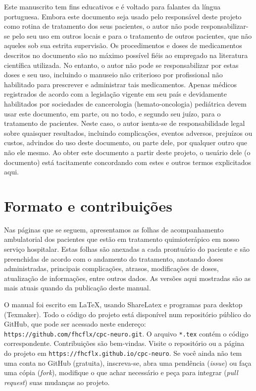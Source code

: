 \documentclass[11pt,a4paper,oldfontcommands]{memoir}
\begin{document}
Este manuscrito tem fins educativos e é voltado para falantes da língua portuguesa.  Embora este documento seja usado pelo responsável deste projeto como rotina de tratamento dos seus pacientes, o autor não pode responsabilizar-se pelo seu uso em outros locais e para o tratamento de outros pacientes, que não aqueles sob sua estrita supervisão. Os procedimentos e doses de medicamentos descritos no documento são no máximo possível fiéis ao empregado na literatura científica utilizada. No entanto, o autor não pode se responsabilizar por estas doses e seu uso, incluindo o manuseio não criterioso por profissional não habilitado para prescrever e administrar tais medicamentos. Apenas médicos registrados de acordo com a legislação vigente em seu país e devidamente habilitados por sociedades de cancerologia (hemato-oncologia) pediátrica devem usar este documento, em parte, ou no todo, e segundo seu juízo, para o tratamento de pacientes. Neste caso, o autor isenta-se de responsabilidade legal sobre quaisquer resultados, incluindo complicações, eventos adversos, prejuízos ou custos, advindos do uso deste documento, ou parte dele, por qualquer outro que não ele mesmo. Ao obter este documento a partir deste projeto, o usuário dele (o documento) está tacitamente concordando com estes e outros termos explicitados aqui.

\section{Formato e contribuições}

Nas páginas que se seguem, apresentamos as folhas de acompanhamento ambulatorial dos pacientes que estão em tratamento quimioterápico em nosso serviço hospitalar. Estas folhas são anexadas a cada prontuário do paciente e são preenchidas de acordo com o andamento do tratamento, anotando doses administradas, principais complicações, atrasos, modificações de doses, atualização de informações, entre outros dados. As versões aqui mostradas são as mais atuais quando da publicação deste manual.

O manual foi escrito em LaTeX, usando ShareLatex e programas para desktop (Texmaker). Todo o código do projeto está disponível num repositório público do GitHub, que pode ser acessado neste endereço: \texttt{https://github.com/fhcflx/cpc-neuro.git}. O arquivo \texttt{*.tex} contém o código correspondente. Contribuições são bem-vindas. Visite o repositório ou a página do projeto em \texttt{https://fhcflx.github.io/cpc-neuro}. Se você ainda não tem uma conta no GitHub (gratuita), inscreva-se, abra uma pendência (\textit{issue}) ou faça uma cópia (\textit{fork}), modifique o que achar necessário e peça para integrar (\textit{pull request}) suas mudanças ao projeto.
\cleardoublepage
\end{document}
